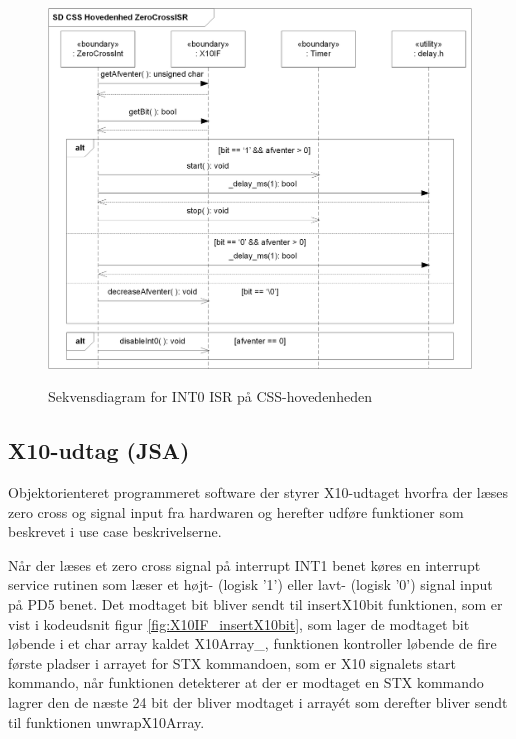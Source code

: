 \begin{figure}[!htb]
     {\includegraphics[width=\textwidth]{billeder/uml/CSS_ZeroCrossInt_SD}}
     \caption{Sekvensdiagram for INT0 ISR på CSS-hovedenheden}
     \label{fig:ZeroCrossISR}
\end{figure}

\subsection{X10-udtag (JSA)}

Objektorienteret programmeret software der styrer X10-udtaget hvorfra der læses zero cross og signal input fra hardwaren og herefter udføre funktioner som beskrevet i use case beskrivelserne.

Når der læses et zero cross signal på interrupt INT1 benet køres en interrupt service rutinen som læser et højt- (logisk '1') eller lavt- (logisk '0') signal input på PD5 benet. Det modtaget bit bliver sendt til insertX10bit funktionen, som er vist i kodeudsnit figur \ref{fig:X10IF_insertX10bit}, som lager de modtaget bit løbende i et char array kaldet X10Array\_, funktionen kontroller løbende de fire første pladser i arrayet for STX kommandoen, som er X10 signalets start kommando, når funktionen detekterer at der er modtaget en STX kommando lagrer den de næste 24 bit der bliver modtaget i array\'et som derefter bliver sendt til funktionen unwrapX10Array. 


